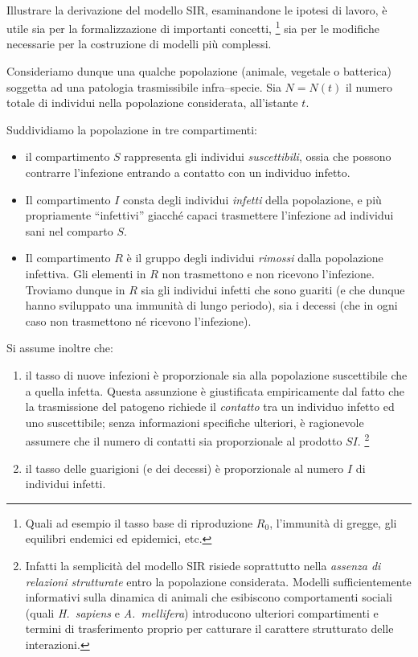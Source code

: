 \paragraph{}
Illustrare la derivazione del modello SIR, esaminandone le ipotesi di lavoro, è utile sia per la formalizzazione
di importanti concetti,%
\footnote{Quali ad esempio il tasso base di riproduzione $R_0$, l'immunità di gregge, gli
equilibri endemici ed epidemici, etc.}
sia per le modifiche necessarie per la costruzione di modelli più complessi.

Consideriamo dunque una qualche popolazione (animale, vegetale o batterica) soggetta ad una patologia trasmissibile
infra--specie. Sia $N =N(t)$ il numero totale di individui nella popolazione considerata, all'istante $t$.

Suddividiamo la popolazione in tre compartimenti:
\begin{itemize}
    \item il compartimento $S$ rappresenta gli individui \emph{suscettibili}, ossia che possono contrarre
        l'infezione entrando a contatto con un individuo infetto.
    \item Il compartimento $I$ consta degli individui \emph{infetti} della popolazione, e più propriamente
        ``infettivi'' giacché capaci trasmettere l'infezione ad individui sani nel comparto $S$.
    \item Il compartimento $R$ è il gruppo degli individui \emph{rimossi} dalla popolazione infettiva.
        Gli elementi in $R$ non trasmettono e non ricevono l'infezione. Troviamo dunque in $R$ sia gli individui
        infetti che sono guariti (e che dunque hanno sviluppato una immunità di lungo periodo), sia i decessi (che
        in ogni caso non trasmettono né ricevono l'infezione).
\end{itemize}

Si assume inoltre che:
\begin{enumerate}
    \item il tasso di nuove infezioni è proporzionale sia alla popolazione suscettibile che a quella infetta.
        Questa assunzione è giustificata empiricamente dal fatto che la trasmissione del patogeno richiede il
        \emph{contatto} tra un individuo infetto ed uno suscettibile; senza informazioni specifiche ulteriori,
        è ragionevole assumere che il numero di contatti sia proporzionale al prodotto $SI$.
        \footnote{Infatti la semplicità del modello SIR risiede soprattutto nella \emph{assenza di relazioni
            strutturate} entro la popolazione considerata. Modelli sufficientemente informativi sulla dinamica
            di animali che esibiscono comportamenti sociali (quali \emph{H.~sapiens} e \emph{A.~mellifera})
            introducono ulteriori compartimenti e termini di trasferimento proprio per catturare il carattere
            strutturato delle interazioni.}
    \item il tasso delle guarigioni (e dei decessi) è proporzionale al numero $I$ di individui infetti.
\end{enumerate}

